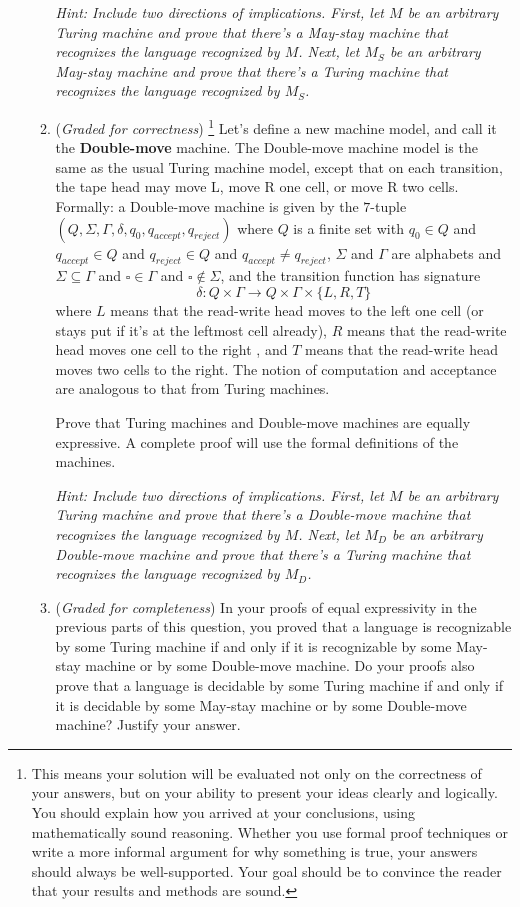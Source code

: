 \documentclass[12pt, oneside]{article}
\newcommand{\gradeCorrect}{({\it Graded for correctness}) }
\newcommand{\gradeCorrectFirst}{\gradeCorrect\footnote{This means your solution 
will be evaluated not only on the correctness of your answers, but on your ability
to present your ideas clearly and logically. You should explain how you 
arrived at your conclusions, using
mathematically sound reasoning. Whether you use formal proof techniques or 
write a more informal argument
for why something is true, your answers should always be well-supported. 
Your goal should be to convince the
reader that your results and methods are sound.} }
\newcommand{\gradeComplete}{({\it Graded for completeness}) }
\begin{document}
\begin{enumerate}[wide, labelwidth=!, labelindent=0pt]
\begin{enumerate}
{\it Hint: Include two directions of implications. First, let $M$ be an 
arbitrary Turing machine and prove that there's a May-stay machine 
that recognizes the language recognized by $M$. Next, let $M_S$ 
be an arbitrary May-stay 
machine and prove that there's a Turing machine that recognizes the language
recognized by $M_S$.}

\item\gradeCorrectFirst Let's define a new machine model, and call it the {\bf Double-move}  machine.
The Double-move machine model is the same as the usual Turing machine model,  except that on each transition, the tape head may move L, move R one cell, or 
move R two cells. Formally: a Double-move machine is given by the $7$-tuple 
$(Q, \Sigma, \Gamma, \delta, q_0, q_{accept}, q_{reject})$ where 
$Q$ is a finite set with $q_0 \in Q$ and $q_{accept} \in Q$
and $q_{reject} \in Q$ and $q_{accept} \neq q_{reject}$, 
$\Sigma$ and $\Gamma$ are alphabets and $\Sigma \subseteq \Gamma$ and $\square \in \Gamma$ and $\square \notin \Sigma$, and the transition function 
has signature
\[
  \delta: Q \times \Gamma \to Q \times \Gamma \times \{L, R, T\}
\]
where $L$ means that the read-write head moves to the left one cell (or stays
put if it's at the leftmost cell already), $R$ means that the read-write head 
moves one cell to the right , and $T$ means that the read-write head moves 
two cells to the right. The notion of computation and acceptance are analogous to that from Turing machines.

Prove that Turing machines and Double-move machines are equally expressive.
A complete proof will use the formal definitions of the machines.

{\it Hint: Include two directions of implications. First, let $M$ be an 
arbitrary Turing machine and prove that there's a Double-move machine 
that recognizes the language recognized by $M$. Next, let $M_D$ 
be an arbitrary Double-move
machine and prove that there's a Turing machine that recognizes the language
recognized by $M_D$.}

\item \gradeComplete In your proofs of equal expressivity in the previous 
parts of this question, you proved that a language is recognizable by some
Turing machine if and only if it is recognizable by some May-stay machine
or by some Double-move machine. Do your proofs also prove that a language is 
decidable by some
Turing machine if and only if it is decidable by some May-stay machine
or by some Double-move machine? Justify your answer.
\end{enumerate}


\end{enumerate}
\end{document}
